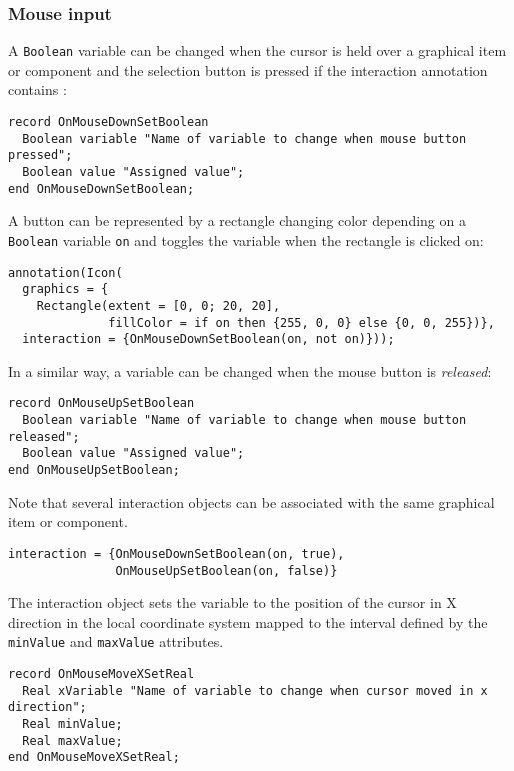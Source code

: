 \subsubsection{Mouse input}\label{mouse-input}

A \lstinline!Boolean! variable can be changed when the cursor is held over a graphical item or component and the selection button is pressed if the interaction annotation contains :
\begin{lstlisting}[language=modelica]
record OnMouseDownSetBoolean
  Boolean variable "Name of variable to change when mouse button pressed";
  Boolean value "Assigned value";
end OnMouseDownSetBoolean;
\end{lstlisting}

\begin{example}
A button can be represented by a rectangle changing color depending on a \lstinline!Boolean! variable \lstinline!on! and toggles the
variable when the rectangle is clicked on:
\begin{lstlisting}[language=modelica]
annotation(Icon(
  graphics = {
    Rectangle(extent = [0, 0; 20, 20],
              fillColor = if on then {255, 0, 0} else {0, 0, 255})},
  interaction = {OnMouseDownSetBoolean(on, not on)}));
\end{lstlisting}
\end{example}

In a similar way, a variable can be changed when the mouse button is \emph{released}:
\begin{lstlisting}[language=modelica]
record OnMouseUpSetBoolean
  Boolean variable "Name of variable to change when mouse button released";
  Boolean value "Assigned value";
end OnMouseUpSetBoolean;
\end{lstlisting}%

Note that several interaction objects can be associated with the same graphical item or component.
\begin{example}
\begin{lstlisting}[language=modelica]
interaction = {OnMouseDownSetBoolean(on, true),
               OnMouseUpSetBoolean(on, false)}
\end{lstlisting}
\end{example}

The  interaction object sets the variable to the position of the cursor in X direction in the local coordinate system mapped to the interval defined by the \lstinline!minValue! and \lstinline!maxValue! attributes.
\begin{lstlisting}[language=modelica]
record OnMouseMoveXSetReal
  Real xVariable "Name of variable to change when cursor moved in x direction";
  Real minValue;
  Real maxValue;
end OnMouseMoveXSetReal;
\end{lstlisting}

